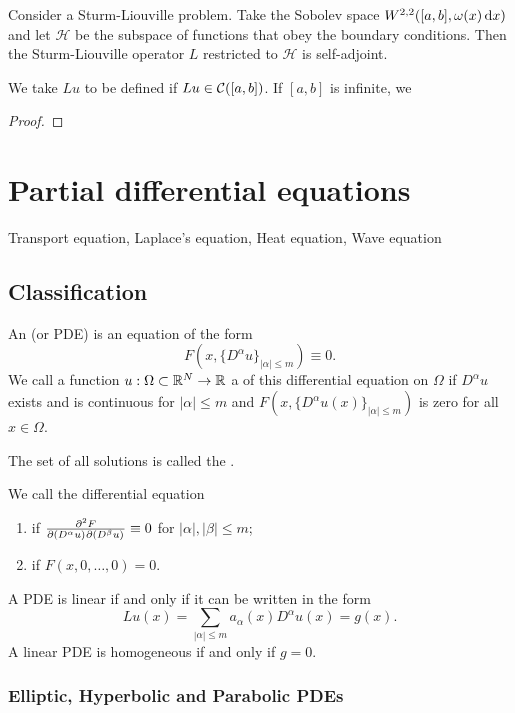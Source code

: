 \begin{proposition}
Consider a Sturm-Liouville problem. Take the Sobolev space $W^{2,2}([a,b], \omega(x)\operatorname{d \!}{x})$ and let $\mathcal{H}$ be the subspace of functions that obey the boundary conditions. Then the Sturm-Liouville operator $L$ restricted to $\mathcal{H}$ is self-adjoint.
\end{proposition}
We take $Lu$ to be defined if $Lu\in\operatorname{\mathcal{C}}([a,b])$. If $[a,b]$ is infinite, we 
\begin{proof}

\end{proof}

\chapter{Partial differential equations}
Transport equation, Laplace's equation, Heat equation, Wave equation
\section{Classification}
\begin{definition}
An  (or PDE) is an equation of the form
\[ F(x, \{D^\alpha u\}_{|\alpha|\leq m}) \equiv 0. \]
We call a  function $u: \Omega \subset \mathbb{R}^N \to \mathbb{R}$ a  of this differential equation on $\Omega$ if $D^\alpha u$ exists and is continuous for $|\alpha|\leq m$ and $F(x, \{D^\alpha u(x)\}_{|\alpha|\leq m})$ is zero for all $x\in \Omega$.

The set of all solutions is called the .

We call the differential equation
\begin{enumerate}
\item {} if $\md{F}{2}{(D^\alpha u)}{}{(D^\beta u)}{} \equiv 0$ for $|\alpha|,|\beta|\leq m$;
\item {} if $F(x, 0,\ldots, 0) = 0$.
\end{enumerate}
\end{definition}

\begin{lemma}
A PDE is linear \textup{if and only if} it can be written in the form
\[ Lu(x) = \sum_{|\alpha|\leq m}a_\alpha(x)D^\alpha u(x) = g(x). \]
A linear PDE is homogeneous \textup{if and only if} $g = 0$.
\end{lemma}

\subsection{Elliptic, Hyperbolic and Parabolic PDEs}
